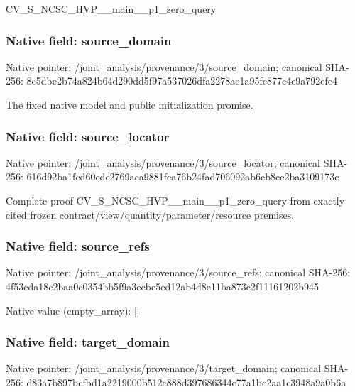 \documentclass[10pt,a4paper]{article}
\begin{document}
\begingroup\raggedright\sloppy CV\_\allowbreak{}S\_\allowbreak{}NCSC\_\allowbreak{}HVP\_\allowbreak{}\_\allowbreak{}main\_\allowbreak{}\_\allowbreak{}p1\_\allowbreak{}zero\_\allowbreak{}query\par\endgroup

\subsubsection{Native field: source\_\allowbreak{}domain}
Native pointer: /joint\_\allowbreak{}analysis/provenance/3/source\_\allowbreak{}domain; canonical SHA-256: 8e5dbe2b74a824b64d290dd5f97a537026dfa2278ae1a95fc877c4e9a792efe4

\begingroup\raggedright\sloppy The fixed native model and public initialization promise.\par\endgroup

\subsubsection{Native field: source\_\allowbreak{}locator}
Native pointer: /joint\_\allowbreak{}analysis/provenance/3/source\_\allowbreak{}locator; canonical SHA-256: 616d92ba1fed60edc2769aca9881fca76b24fad706092ab6cb8ce2ba3109173c

\begingroup\raggedright\sloppy Complete proof CV\_\allowbreak{}S\_\allowbreak{}NCSC\_\allowbreak{}HVP\_\allowbreak{}\_\allowbreak{}main\_\allowbreak{}\_\allowbreak{}p1\_\allowbreak{}zero\_\allowbreak{}query from exactly cited frozen contract/\allowbreak{}view/\allowbreak{}quantity/\allowbreak{}parameter/\allowbreak{}resource premises.\par\endgroup

\subsubsection{Native field: source\_\allowbreak{}refs}
Native pointer: /joint\_\allowbreak{}analysis/provenance/3/source\_\allowbreak{}refs; canonical SHA-256: 4f53cda18c2baa0c0354bb5f9a3ecbe5ed12ab4d8e11ba873c2f11161202b945

Native value (empty\_\allowbreak{}array): []

\subsubsection{Native field: target\_\allowbreak{}domain}
Native pointer: /joint\_\allowbreak{}analysis/provenance/3/target\_\allowbreak{}domain; canonical SHA-256: d83a7b897bcfbd1a2219000b512c888d397686344c77a1bc2aa1c3948a9a0b6a
\end{document}
